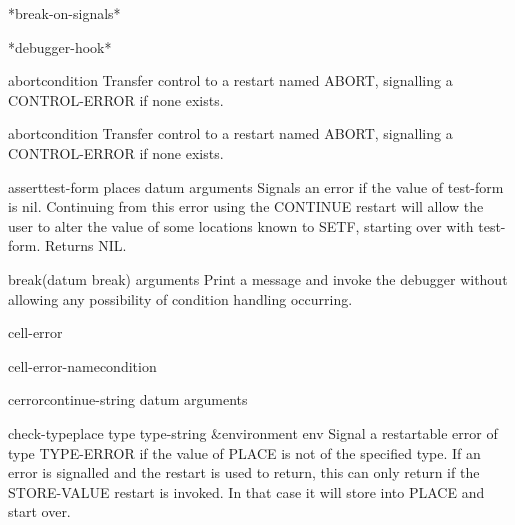 \begin{variable}{*break-on-signals*}{}{}
  
\end{variable}

\begin{variable}{*debugger-hook*}{}{}
  
\end{variable}

\begin{function}{abort}{\op condition}{}
  Transfer control to a restart named ABORT, signalling a CONTROL-ERROR if
   none exists.
\end{function}

\begin{restart}{abort}{\op condition}{}
  Transfer control to a restart named ABORT, signalling a CONTROL-ERROR if
   none exists.
\end{restart}

\begin{macro}{assert}{test-form \op places datum \rest arguments}{}
  Signals an error if the value of test-form is nil. Continuing from this
   error using the CONTINUE restart will allow the user to alter the value of
   some locations known to SETF, starting over with test-form. Returns NIL.
\end{macro}

\begin{function}{break}{\op (datum break) \rest arguments}{}
  Print a message and invoke the debugger without allowing any possibility
   of condition handling occurring.
\end{function}

\begin{condition-type}{cell-error}{}{}
  
\end{condition-type}

\begin{function}{cell-error-name}{condition}{}
  
\end{function}

\begin{function}{cerror}{continue-string datum \rest arguments}{}
  
\end{function}

\begin{macro}{check-type}{place type \op type-string &environment env}{}
  Signal a restartable error of type TYPE-ERROR if the value of PLACE
is not of the specified type. If an error is signalled and the restart
is used to return, this can only return if the STORE-VALUE restart is
invoked. In that case it will store into PLACE and start over.
\end{macro}

